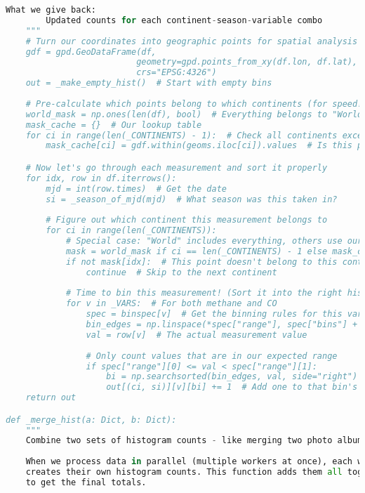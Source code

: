 \begin{lstlisting}[language=Python, caption=Histogram Generation Algorithm, label=alg:step03_histos, breaklines=true]
    What we give back:
        Updated counts for each continent-season-variable combo
    """
    # Turn our coordinates into geographic points for spatial analysis
    gdf = gpd.GeoDataFrame(df, 
                          geometry=gpd.points_from_xy(df.lon, df.lat), 
                          crs="EPSG:4326")
    out = _make_empty_hist()  # Start with empty bins
    
    # Pre-calculate which points belong to which continents (for speed!)
    world_mask = np.ones(len(df), bool)  # Everything belongs to "World" category
    mask_cache = {}  # Our lookup table
    for ci in range(len(_CONTINENTS) - 1):  # Check all continents except "World"
        mask_cache[ci] = gdf.within(geoms.iloc[ci]).values  # Is this point inside this continent?

    # Now let's go through each measurement and sort it properly
    for idx, row in df.iterrows():
        mjd = int(row.times)  # Get the date
        si = _season_of_mjd(mjd)  # What season was this taken in?
        
        # Figure out which continent this measurement belongs to
        for ci in range(len(_CONTINENTS)):
            # Special case: "World" includes everything, others use our pre-calculated masks
            mask = world_mask if ci == len(_CONTINENTS) - 1 else mask_cache[ci]
            if not mask[idx]:  # This point doesn't belong to this continent
                continue  # Skip to the next continent
                
            # Time to bin this measurement! (Sort it into the right histogram bucket)
            for v in _VARS:  # For both methane and CO
                spec = binspec[v]  # Get the binning rules for this variable
                bin_edges = np.linspace(*spec["range"], spec["bins"] + 1)  # Create the bin boundaries
                val = row[v]  # The actual measurement value
                
                # Only count values that are in our expected range
                if spec["range"][0] <= val < spec["range"][1]:
                    bi = np.searchsorted(bin_edges, val, side="right") - 1  # Find which bin this belongs in
                    out[(ci, si)][v][bi] += 1  # Add one to that bin's count!
    return out

def _merge_hist(a: Dict, b: Dict):
    """
    Combine two sets of histogram counts - like merging two photo albums!
    
    When we process data in parallel (multiple workers at once), each worker
    creates their own histogram counts. This function adds them all together
    to get the final totals.
    

\end{lstlisting}
